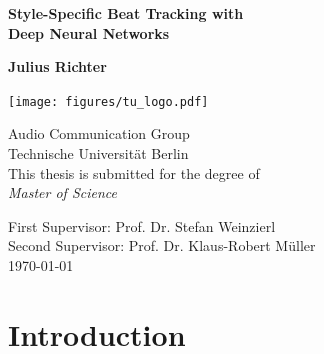 \documentclass{scrartcl}
\begin{document}
\pagestyle{plain}

\begin{titlepage}
\begin{center}
\vspace*{1cm}
\huge
\textbf{Style-Specific Beat Tracking with\\ Deep Neural Networks}
\vspace{2.0cm}

\Large
\textbf{Julius Richter}
\vspace{0.8cm}

\texttt{[image: figures/tu\_logo.pdf]}

\vspace{0.4cm}
Audio Communication Group\\
Technische Universität Berlin\\
\vspace{2.5cm}
This thesis is submitted for the degree of\\
\emph{Master of Science}

\vspace{2.5cm}
First Supervisor: Prof. Dr. Stefan Weinzierl \\
Second Supervisor: Prof. Dr. Klaus-Robert Müller\\
\vspace{1.5cm}
\today
\end{center}
\end{titlepage}


\tableofcontents
\newpage


\section{Introduction}
\end{document}
